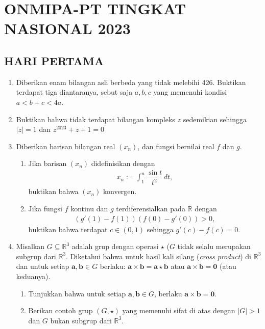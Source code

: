 \documentclass[12pt,twoside]{article}
\begin{document}
\pagebreak

\section{ONMIPA-PT TINGKAT NASIONAL 2023}
\subsection{HARI PERTAMA}
\begin{enumerate}
    \item Diberikan enam bilangan asli berbeda
          yang tidak melebihi 426. Buktikan terdapat tiga diantaranya, sebut saja $a,b,c$ yang memenuhi kondisi $a<b+c<4a$.
    \item Buktikan bahwa tidak terdapat bilangan kompleks $z$ sedemikian sehingga $|z|=1$ dan $z^{2023}+z+1=0$
    \item Diberikan barisan bilangan real $(x_n)$, dan fungsi bernilai real $f$ dan $g$.
          \begin{enumerate}
              \item Jika barisan $(x_n)$ didefinisikan dengan \begin{align*}
                        x_n := \int_1^n \dfrac{\sin t}{t^2}\, dt,
                    \end{align*}
                    buktikan bahwa $(x_n)$ konvergen.
              \item Jika fungsi $f$ kontinu dan $g$ terdiferensialkan pada $\mathbb{R}$ dengan
                    \begin{align*}
                        (g'(1)-f(1))(f(0)-g'(0))>0,
                    \end{align*}
                    buktikan bahwa terdapat $c\in (0,1)$ sehingga $g'(c)-f(c)=0$.
          \end{enumerate}
    \item Misalkan $G\subseteq \mathbb{R}^3$ adalah grup dengan operasi $\star$ ($G$ tidak selalu merupakan subgrup dari $\mathbb{R}^3$. Diketahui bahwa untuk hasil kali silang (\textit{cross product}) di $\mathbb{R}^3$ dan untuk setiap $\mathbf{a,b}\in G$ berlaku: $\mathbf{a}\times \mathbf{b}=\mathbf{a}\star \mathbf{b}$ atau $\mathbf{a}\times \mathbf{b} = \mathbf{0}$ (atau keduanya).
          \begin{enumerate}
              \item Tunjukkan bahwa untuk setiap $\mathbf{a,b}\in G$, berlaku $\mathbf{a}\times\mathbf{b}=\mathbf{0}$.
              \item Berikan contoh grup $(G,\star)$ yang memenuhi sifat di atas dengan $|G|>1$ dan $G$ bukan subgrup dari $\mathbb{R}^3$.

\end{enumerate}
\end{enumerate}
\end{document}
